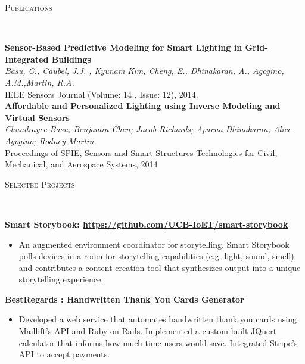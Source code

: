 \documentclass[9pt]{extarticle}
\newenvironment{changemargin}[2]{%
  \begin{list}{}{%
    \setlength{\topsep}{0pt}%
    \setlength{\leftmargin}{#1}%
    \setlength{\rightmargin}{#2}%
    \setlength{\listparindent}{\parindent}%
    \setlength{\itemindent}{\parindent}%
    \setlength{\parsep}{\parskip}%
  }%
  \item[]}{\end{list}
}
\newcommand{\lineover}{
	\begin{changemargin}{-0.05in}{-0.05in}
		\vspace*{-8pt}
		\hrulefill \\
		\vspace*{-2pt}
	\end{changemargin}
}
\newcommand{\header}[1]{
    \vspace{5pt}
	\begin{changemargin}{-0.5in}{-0.5in}
		\scshape{#1}\\
  	\lineover
	\end{changemargin}
	\vspace{5pt}
}
\newenvironment{body} {
	\vspace*{-9pt}
	\begin{changemargin}{-0.5in}{-0.5in}
  }	
	{\end{changemargin}
}
\begin{document}

\vspace*{-5pt}
\header{Publications}
\begin{body}

\textbf {Sensor-Based Predictive Modeling for Smart Lighting in Grid-Integrated Buildings}\\ 
\emph{Basu, C., Caubel, J.J. , Kyunam Kim, Cheng, E., Dhinakaran, A., Agogino, A.M.,Martin, R.A.} \\
{IEEE Sensors Journal (Volume: 14 , Issue: 12), 2014. }\\

$ $\\

\textbf {Affordable and Personalized Lighting using Inverse Modeling and Virtual Sensors}\\
\emph{Chandrayee Basu; Benjamin Chen; Jacob Richards; Aparna Dhinakaran; Alice Agogino; Rodney Martin.} \\
{Proceedings of SPIE, Sensors and Smart Structures Technologies for Civil, Mechanical, and Aerospace Systems, 2014}
\end{body}

\vspace*{-5pt}
\header{Selected Projects}
\begin{body}


	\textbf {Smart Storybook: {\url{https://github.com/UCB-IoET/smart-storybook}}}
    \vspace*{-6pt}
    \begin{itemize}
    \item[] An augmented environment coordinator for storytelling. Smart Storybook polls devices in a room for storytelling capabilities (e.g. light, sound, smell) and contributes a content creation tool that synthesizes output into a unique storytelling experience.
    \end{itemize}

	\textbf {BestRegards : Handwritten Thank You Cards Generator}
    \vspace*{-6pt}
    \begin{itemize}
    \item[] Developed a web service that automates handwritten thank you cards using Maillift's API and Ruby on Rails. Implemented a custom-built JQuert calculator that informs how much time users would save. Integrated Stripe's API to accept payments.
    \end{itemize}
    \end{body}
\end{document}

